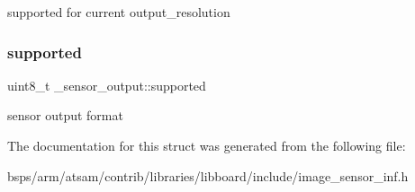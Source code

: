 supported for current output\+\_\+resolution \mbox{\label{struct__sensor__output_adb2d9d82d9f87b0381d6e4b5f9a38e9b}} 
\subsubsection{\texorpdfstring{supported}{supported}}
{\footnotesize\ttfamily uint8\+\_\+t \+\_\+sensor\+\_\+output\+::supported}

sensor output format 

The documentation for this struct was generated from the following file\+:\begin{DoxyCompactItemize}
\item 
bsps/arm/atsam/contrib/libraries/libboard/include/image\+\_\+sensor\+\_\+inf.\+h\end{DoxyCompactItemize}
